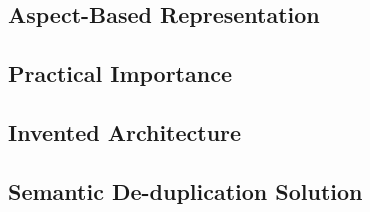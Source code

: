 \subsection{Aspect-Based Representation}


\subsection{Practical Importance}


\subsection{Invented Architecture}
\label{sec:architecture}


\subsection{Semantic De-duplication Solution}

